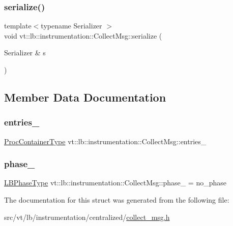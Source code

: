 \subsubsection{\texorpdfstring{serialize()}{serialize()}}
{\footnotesize\ttfamily template$<$typename Serializer $>$ \\
void vt\+::lb\+::instrumentation\+::\+Collect\+Msg\+::serialize (\begin{DoxyParamCaption}\item[{Serializer \&}]{s }\end{DoxyParamCaption})\hspace{0.3cm}{\ttfamily [inline]}}



\subsection{Member Data Documentation}
\mbox{\label{structvt_1_1lb_1_1instrumentation_1_1_collect_msg_a4431d40e13ec74c0efaef51d45e5feb0}} 
\subsubsection{\texorpdfstring{entries\+\_\+}{entries\_}}
{\footnotesize\ttfamily \hyperlink{namespacevt_1_1lb_af7c6ee21a7b3966b7ab64c5b626d30f8}{Proc\+Container\+Type} vt\+::lb\+::instrumentation\+::\+Collect\+Msg\+::entries\+\_\+}

\mbox{\label{structvt_1_1lb_1_1instrumentation_1_1_collect_msg_abb032f5e30ac3cb1c9973b360ec75634}} 
\subsubsection{\texorpdfstring{phase\+\_\+}{phase\_}}
{\footnotesize\ttfamily \hyperlink{namespacevt_a5505d0bab25ce2ff566a8e015871b379}{L\+B\+Phase\+Type} vt\+::lb\+::instrumentation\+::\+Collect\+Msg\+::phase\+\_\+ = no\+\_\+phase}



The documentation for this struct was generated from the following file\+:\begin{DoxyCompactItemize}
\item 
src/vt/lb/instrumentation/centralized/\hyperlink{collect__msg_8h}{collect\+\_\+msg.\+h}\end{DoxyCompactItemize}

